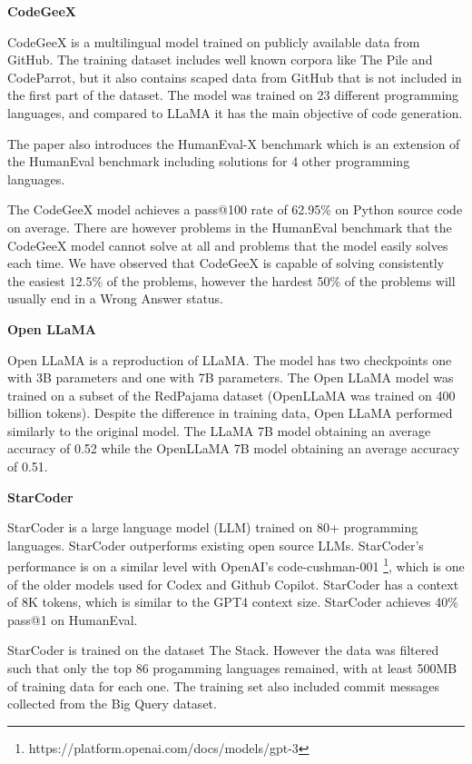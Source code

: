 \documentclass[12pt,a4paper]{report}
\begin{document}
\textbf{CodeGeeX}

CodeGeeX \cite{zheng2023codegeex} is a multilingual model trained on publicly available data from GitHub. The training dataset includes well known corpora like The Pile and CodeParrot, but it also contains scaped data from GitHub that is not included in the first part of the dataset. The model was trained on 23 different programming languages, and compared to LLaMA it has the main objective of code generation.

The paper also introduces the HumanEval-X benchmark which is an extension of the HumanEval benchmark including solutions for 4 other programming languages.

The CodeGeeX model achieves a pass@100 rate of 62.95\% on Python source code on average. There are however problems in the HumanEval benchmark that the CodeGeeX model cannot solve at all and problems that the model easily solves each time. We have observed that CodeGeeX is capable of solving consistently the easiest 12.5\% of the problems, however the hardest 50\% of the problems will usually end in a Wrong Answer status.

\textbf{Open LLaMA}

Open LLaMA \cite{openlm2023openllama} is a reproduction of LLaMA. The model has two checkpoints one with 3B parameters and one with 7B parameters. The Open LLaMA model was trained on a subset of the RedPajama dataset (OpenLLaMA was trained on 400 billion tokens). Despite the difference in training data, Open LLaMA performed similarly to the original model. The LLaMA 7B model obtaining an average accuracy of 0.52 while the OpenLLaMA 7B model obtaining an average accuracy of 0.51.

\textbf{StarCoder}

StarCoder \cite{li2023starcoder} is a large language model (LLM) trained on 80+ programming languages. StarCoder outperforms existing open source LLMs. StarCoder's performance is on a similar level with OpenAI's code-cushman-001 \footnote{https://platform.openai.com/docs/models/gpt-3}, which is one of the older models used for Codex and Github Copilot. StarCoder has a context of 8K tokens, which is similar to the GPT4 context size. StarCoder achieves 40\% pass@1 on HumanEval.

StarCoder is trained on the dataset The Stack. However the data was filtered such that only the top 86 progamming languages remained, with at least 500MB of training data for each one. The training set also included commit messages collected from the Big Query dataset.
\end{document}
